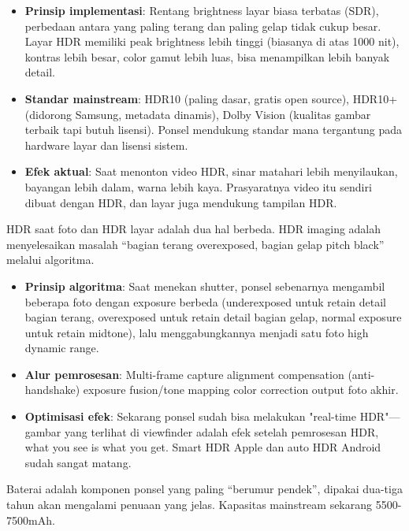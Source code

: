 \begin{itemize}
  \item \textbf{Prinsip implementasi}: Rentang brightness layar biasa terbatas (SDR), perbedaan antara yang paling terang dan paling gelap tidak cukup besar. Layar HDR memiliki peak brightness lebih tinggi (biasanya di atas 1000 nit), kontras lebih besar, color gamut lebih luas, bisa menampilkan lebih banyak detail.
  \item \textbf{Standar mainstream}: HDR10 (paling dasar, gratis open source), HDR10+ (didorong Samsung, metadata dinamis), Dolby Vision (kualitas gambar terbaik tapi butuh lisensi). Ponsel mendukung standar mana tergantung pada hardware layar dan lisensi sistem.
  \item \textbf{Efek aktual}: Saat menonton video HDR, sinar matahari lebih menyilaukan, bayangan lebih dalam, warna lebih kaya. Prasyaratnya video itu sendiri dibuat dengan HDR, dan layar juga mendukung tampilan HDR.
\end{itemize}


HDR saat foto dan HDR layar adalah dua hal berbeda. HDR imaging adalah menyelesaikan masalah “bagian terang overexposed, bagian gelap pitch black” melalui algoritma.

\begin{itemize}
  \item \textbf{Prinsip algoritma}: Saat menekan shutter, ponsel sebenarnya mengambil beberapa foto dengan exposure berbeda (underexposed untuk retain detail bagian terang, overexposed untuk retain detail bagian gelap, normal exposure untuk retain midtone), lalu menggabungkannya menjadi satu foto high dynamic range.
  \item \textbf{Alur pemrosesan}: Multi-frame capture alignment compensation (anti-handshake) exposure fusion/tone mapping color correction output foto akhir.
  \item \textbf{Optimisasi efek}: Sekarang ponsel sudah bisa melakukan "real-time HDR"—gambar yang terlihat di viewfinder adalah efek setelah pemrosesan HDR, what you see is what you get. Smart HDR Apple dan auto HDR Android sudah sangat matang.
\end{itemize}


Baterai adalah komponen ponsel yang paling “berumur pendek”, dipakai dua-tiga tahun akan mengalami penuaan yang jelas. Kapasitas mainstream sekarang 5500-7500mAh.

